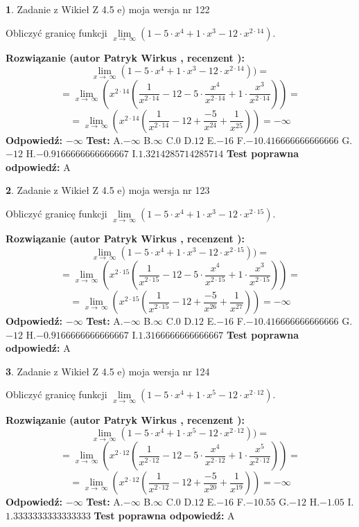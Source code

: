 \documentclass[12pt, a4paper]{article}
\theoremstyle{definition} %
\newtheorem{zad}{}
\newcommand{\zadStart}[1]{\begin{zad}#1\newline}
\newcommand{\zadStop}{\end{zad}}
\newcommand{\rozwStart}[2]{\noindent \textbf{Rozwiązanie (autor #1 , recenzent #2): }\newline}
\newcommand{\rozwStop}{\newline}
\newcommand{\odpStart}{\noindent \textbf{Odpowiedź:}\newline}
\newcommand{\odpStop}{\newline}
\newcommand{\testStart}{\noindent \textbf{Test:}\newline}
\newcommand{\testStop}{\newline}
\newcommand{\kluczStart}{\noindent \textbf{Test poprawna odpowiedź:}\newline}
\newcommand{\kluczStop}{\newline}
\begin{document}
\zadStart{Zadanie z Wikieł Z 4.5 e) moja wersja nr 122}


Obliczyć granicę funkcji  $\lim\limits_{x\to\ \infty}(1 - 5 \cdot x^{4}+1 \cdot x^{3}- 12 \cdot x^{2\cdot14})$.
\zadStop
\rozwStart{Patryk Wirkus}{}
$$\lim\limits_{x\to\ \infty}(1 - 5 \cdot x^{4}+1 \cdot x^{3}- 12 \cdot x^{2\cdot14}))=$$
$$=\lim\limits_{x\to\ \infty}(x^{2\cdot14}(\frac{1}{x^{2\cdot14}}-12 -5 \cdot \frac{x^{4}}{x^{2\cdot14}}+1 \cdot \frac{x^{3}}{x^{2\cdot14}}))=$$
$$=\lim\limits_{x\to\ \infty}(x^{2\cdot14}(\frac{1}{x^{2\cdot14}}-12 + \frac{-5}{x^{24}}+ \frac{1}{x^{25}}))=-\infty$$
\rozwStop
\odpStart
$-\infty$
\odpStop
\testStart
A.$-\infty$ B.$\infty$ C.$0$ D.$12$ E.$-16$
F.$-10.416666666666666$ G.$-12$
H.$-0.9166666666666667$
I.$1.3214285714285714$
\testStop
\kluczStart
A
\kluczStop



\zadStart{Zadanie z Wikieł Z 4.5 e) moja wersja nr 123}


Obliczyć granicę funkcji  $\lim\limits_{x\to\ \infty}(1 - 5 \cdot x^{4}+1 \cdot x^{3}- 12 \cdot x^{2\cdot15})$.
\zadStop
\rozwStart{Patryk Wirkus}{}
$$\lim\limits_{x\to\ \infty}(1 - 5 \cdot x^{4}+1 \cdot x^{3}- 12 \cdot x^{2\cdot15}))=$$
$$=\lim\limits_{x\to\ \infty}(x^{2\cdot15}(\frac{1}{x^{2\cdot15}}-12 -5 \cdot \frac{x^{4}}{x^{2\cdot15}}+1 \cdot \frac{x^{3}}{x^{2\cdot15}}))=$$
$$=\lim\limits_{x\to\ \infty}(x^{2\cdot15}(\frac{1}{x^{2\cdot15}}-12 + \frac{-5}{x^{26}}+ \frac{1}{x^{27}}))=-\infty$$
\rozwStop
\odpStart
$-\infty$
\odpStop
\testStart
A.$-\infty$ B.$\infty$ C.$0$ D.$12$ E.$-16$
F.$-10.416666666666666$ G.$-12$
H.$-0.9166666666666667$
I.$1.3166666666666667$
\testStop
\kluczStart
A
\kluczStop



\zadStart{Zadanie z Wikieł Z 4.5 e) moja wersja nr 124}


Obliczyć granicę funkcji  $\lim\limits_{x\to\ \infty}(1 - 5 \cdot x^{4}+1 \cdot x^{5}- 12 \cdot x^{2\cdot12})$.
\zadStop
\rozwStart{Patryk Wirkus}{}
$$\lim\limits_{x\to\ \infty}(1 - 5 \cdot x^{4}+1 \cdot x^{5}- 12 \cdot x^{2\cdot12}))=$$
$$=\lim\limits_{x\to\ \infty}(x^{2\cdot12}(\frac{1}{x^{2\cdot12}}-12 -5 \cdot \frac{x^{4}}{x^{2\cdot12}}+1 \cdot \frac{x^{5}}{x^{2\cdot12}}))=$$
$$=\lim\limits_{x\to\ \infty}(x^{2\cdot12}(\frac{1}{x^{2\cdot12}}-12 + \frac{-5}{x^{20}}+ \frac{1}{x^{19}}))=-\infty$$
\rozwStop
\odpStart
$-\infty$
\odpStop
\testStart
A.$-\infty$ B.$\infty$ C.$0$ D.$12$ E.$-16$
F.$-10.55$ G.$-12$
H.$-1.05$
I.$1.3333333333333333$
\testStop
\kluczStart
A
\kluczStop
\end{document}
